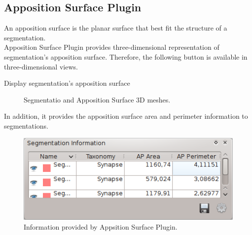 \subsection{Apposition Surface Plugin}

An apposition surface is the planar surface that best fit the structure of a
segmentation.\\

Apposition Surface Plugin provides three-dimensional representation of
segmentation's apposition surface. Therefore, the following button is available
in three-dimensional views.\\

\vspace{0.3cm}

{Display segmentation's apposition surface}

\begin{figure}[H]
  \label{Fig:color_tracking}
  \hfill
  \hfill
\caption{Segmentatio and Apposition Surface 3D meshes.}
\end{figure}

In addition, it provides the apposition surface area and perimeter information
to segmentations.\\

\begin{figure}[H]
\centering
\includegraphics{fig/AppSurface-info}
\caption{Information provided by Appsition Surface Plugin.}
\end{figure}
